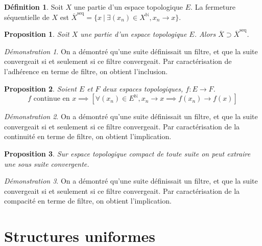 \documentclass[a4paper, 11pt, french]{book}
\theoremstyle{plain} %
\newtheorem{proposition}{Proposition}
\theoremstyle{definition} %
\newtheorem{definition}{Définition}
\theoremstyle{remark} %
\newtheorem*{demonstration}{Démonstration}
\newcommand{\1}{\mathds{1}}
\newcommand{\N}{\mathbb{N}}
\newcommand\ens[2]{\{#1 \ |\ #2\}}
\begin{document}
\begin{definition}
	Soit $X$ une partie d'un espace topologique $E$.
	La fermeture séquentielle de $X$ est $\overline{X}^\mathrm{seq}=\ens{x}{\exists(x_n)\in X^\N, x_n\rightarrow x}$.
\end{definition}

\begin{proposition}
	Soit $X$ une partie d'un espace topologique $E$.
	Alors $\overline{X}\supset\overline{X}^\mathrm{seq}$.
\end{proposition}

\begin{demonstration}
	On a démontré qu'une suite définissait un filtre, et que la suite convergeait si et seulement si ce filtre convergeait.
	Par caractérisation de l'adhérence en terme de filtre, on obtient l'inclusion.
\end{demonstration}

\begin{proposition}
	Soient $E$ et $F$ deux espaces topologiques, $f:E\rightarrow F$.
	$$
		\text{$f$ continue en $x$}
		\implies
		\left[\forall(x_n)\in E^\N, x_n\rightarrow x\implies f(x_n)\rightarrow f(x)\right]
	$$
\end{proposition}

\begin{demonstration}
	On a démontré qu'une suite définissait un filtre, et que la suite convergeait si et seulement si ce filtre convergeait.
	Par caractérisation de la continuité en terme de filtre, on obtient l'implication.
\end{demonstration}

\begin{proposition}
	Sur espace topologique compact de toute suite on peut extraire une sous suite convergente.
\end{proposition}

\begin{demonstration}
	On a démontré qu'une suite définissait un filtre, et que la suite convergeait si et seulement si ce filtre convergeait.
	Par caractérisation de la compacité en terme de filtre, on obtient l'implication.
\end{demonstration}

\chapter{Structures uniformes}
\end{document}
